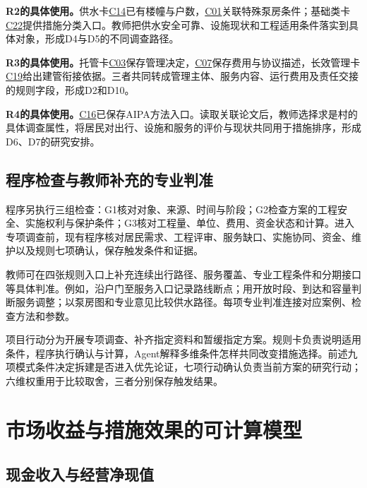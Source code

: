 \documentclass[UTF8,11pt,fontset=windows]{ctexart}
\begin{document}
\textbf{R2的具体使用。}供水卡\hyperlink{EXP-8fb43037-0680-4136-8844-edcb789391f4}{C14}已有楼幢与户数，\hyperlink{EXP-16120dfe-9d94-4394-8880-494b385cf2d2}{C01}关联特殊泵房条件；基础类卡\hyperlink{EXP-e1688c4c-a449-48d4-9d16-38fea3ca845e}{C22}提供措施分类入口。教师把供水安全可靠、设施现状和工程适用条件落实到具体对象，形成D4与D5的不同调查路径。\cite{water,policy}

\textbf{R3的具体使用。}托管卡\hyperlink{EXP-1f50f306-64e5-4335-be56-5c89531c00f2}{C03}保存管理决定，\hyperlink{EXP-3092f687-50c6-452e-b1d1-5703c250c25e}{C07}保存费用与协议描述，长效管理卡\hyperlink{EXP-6baff473-93ed-4160-9a93-a0abf3c7b092}{C19}给出建管衔接依据。三者共同转成管理主体、服务内容、运行费用及责任交接的规则字段，形成D2和D10。\cite{trust,policy}

\textbf{R4的具体使用。}\hyperlink{EXP-2c88cc20-e2d3-4a32-a176-e48d753a4712}{C16}已保存AIPA方法入口。读取关联论文后，教师选择求是村的具体调查属性，将居民对出行、设施和服务的评价与现状共同用于措施排序，形成D6、D7的研究安排。\cite{paper}

\subsection{程序检查与教师补充的专业判准}

程序另执行三组检查：G1核对对象、来源、时间与阶段；G2检查方案的工程安全、实施权利与保护条件；G3核对工程量、单位、费用、资金状态和计算。进入专项调查前，现有程序核对居民需求、工程评审、服务缺口、实施协同、资金、维护以及规则七项确认，保存触发条件和证据。

教师可在四张规则入口上补充连续出行路径、服务覆盖、专业工程条件和分期接口等具体判准。例如，沿户门至服务入口记录路线断点；用开放时段、到达和容量判断服务调整；以泵房图和专业意见比较供水路径。每项专业判准连接对应案例、检查方法和参数。

项目行动分为开展专项调查、补齐指定资料和暂缓指定方案。规则卡负责说明适用条件，程序执行确认与计算，Agent解释多维条件怎样共同改变措施选择。前述九项模式条件决定拆建是否进入优先论证，七项行动确认负责当前方案的研究行动；六维权重用于比较取舍，三者分别保存触发结果。

\section{市场收益与措施效果的可计算模型}

\subsection{现金收入与经营净现值}
\end{document}
